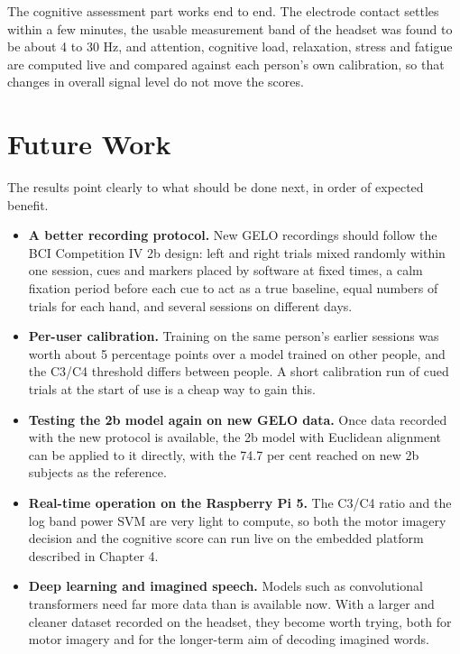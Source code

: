 The cognitive assessment part works end to end. The electrode contact settles within a few
minutes, the usable measurement band of the headset was found to be about 4 to 30 Hz, and
attention, cognitive load, relaxation, stress and fatigue are computed live and compared
against each person's own calibration, so that changes in overall signal level do not
move the scores.

\section{Future Work}

The results point clearly to what should be done next, in order of expected benefit.

\begin{itemize}
    \item \textbf{A better recording protocol.} New GELO recordings should follow the BCI
          Competition IV 2b design: left and right trials mixed randomly within one session,
          cues and markers placed by software at fixed times, a calm fixation period before
          each cue to act as a true baseline, equal numbers of trials for each hand, and
          several sessions on different days.
    \item \textbf{Per-user calibration.} Training on the same person's earlier sessions was
          worth about 5 percentage points over a model trained on other people, and the
          C3/C4 threshold differs between people. A short calibration run of cued trials at
          the start of use is a cheap way to gain this.
    \item \textbf{Testing the 2b model again on new GELO data.} Once data recorded with the
          new protocol is available, the 2b model with Euclidean alignment can be applied to
          it directly, with the 74.7 per cent reached on new 2b subjects as the reference.
    \item \textbf{Real-time operation on the Raspberry Pi 5.} The C3/C4 ratio and the log
          band power SVM are very light to compute, so both the motor imagery decision and
          the cognitive score can run live on the embedded platform described in
          Chapter 4.
    \item \textbf{Deep learning and imagined speech.} Models such as convolutional
          transformers need far more data than is available now. With a larger and cleaner
          dataset recorded on the headset, they become worth trying, both for motor imagery
          and for the longer-term aim of decoding imagined words.
\end{itemize}
